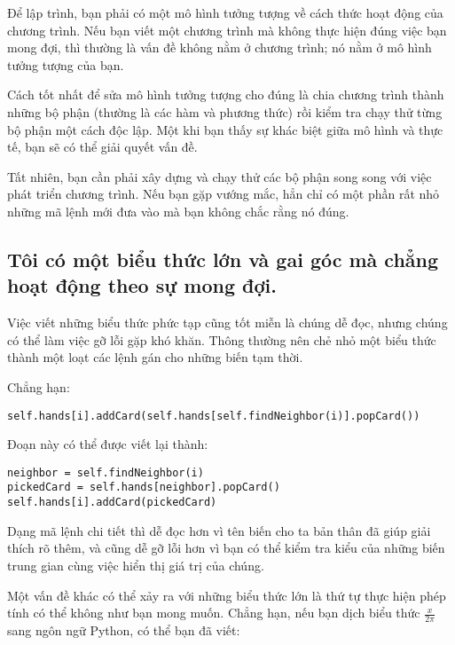 \documentclass[11pt]{book}
\begin{document}
Để lập trình, bạn phải có một mô hình tưởng tượng về cách thức hoạt động
của chương trình. Nếu bạn viết một chương trình mà không thực hiện đúng
việc bạn mong đợi, thì thường là vấn đề không nằm ở chương trình; nó 
nằm ở mô hình tưởng tượng của bạn.


Cách tốt nhất để sửa mô hình tưởng tượng cho đúng là chia chương trình
thành những bộ phận (thường là các hàm và phương thức) rồi kiểm tra
chạy thử từng bộ phận một cách độc lập. Một khi bạn thấy sự khác biệt
giữa mô hình và thực tế, bạn sẽ có thể giải quyết vấn đề.

Tất nhiên, bạn cần phải xây dựng và chạy thử các bộ phận song song
với việc phát triển chương trình. Nếu bạn gặp vướng mắc,
hẳn chỉ có một phần rất nhỏ những mã lệnh mới đưa vào mà bạn
không chắc rằng nó đúng.


\subsection{Tôi có một biểu thức lớn và gai góc mà chẳng hoạt động
theo sự mong đợi.}


Việc viết những biểu thức phức tạp cũng tốt miễn là chúng dễ đọc,
nhưng chúng có thể làm việc gỡ lỗi gặp khó khăn. Thông thường
nên chẻ nhỏ một biểu thức thành một loạt các lệnh gán cho
những biến tạm thời.

Chẳng hạn:

\beforeverb
\begin{verbatim}
self.hands[i].addCard(self.hands[self.findNeighbor(i)].popCard())
\end{verbatim}
\afterverb
%
Đoạn này có thể được viết lại thành:

\beforeverb
\begin{verbatim}
neighbor = self.findNeighbor(i)
pickedCard = self.hands[neighbor].popCard()
self.hands[i].addCard(pickedCard)
\end{verbatim}
\afterverb
%
Dạng mã lệnh chi tiết thì dễ đọc hơn vì tên biến cho ta 
bản thân đã giúp giải thích rõ thêm, và cũng dễ gỡ lỗi hơn vì
bạn có thể kiểm tra kiểu của những biến trung gian cùng việc
hiển thị giá trị của chúng.


Một vấn đề khác có thể xảy ra với những biểu thức lớn là
thứ tự thực hiện phép tính có thể không như bạn mong muốn.
Chẳng hạn, nếu bạn dịch biểu thức 
$\frac{x}{2 \pi}$ sang ngôn ngữ Python, có thể bạn đã viết:
\end{document}
